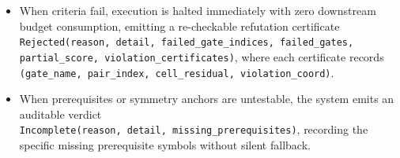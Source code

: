 \begin{enumerate}
\begin{itemize}
    \texttt{Accepted(value, salient\_features, score, detail)}.
    \item When criteria fail, execution is halted immediately with zero downstream budget consumption, emitting a re-checkable refutation certificate\\
    \texttt{Rejected(reason, detail, failed\_gate\_indices, failed\_gates,}\\
    \texttt{partial\_score, violation\_certificates)}, where each certificate records\\
    \texttt{(gate\_name, pair\_index, cell\_residual, violation\_coord)}.
    \item When prerequisites or symmetry anchors are untestable, the system emits an auditable verdict\\
    \texttt{Incomplete(reason, detail, missing\_prerequisites)}, recording the specific missing prerequisite symbols without silent fallback.
  \end{itemize}
\end{enumerate}


